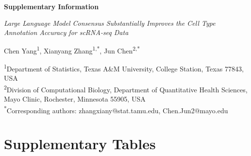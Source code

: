 \documentclass[11pt]{article}
\begin{document}
\begin{center}
\textcolor{natureteal}{\LARGE\textbf{Supplementary Information}}
\end{center}
\vspace{0.5cm}
\begin{center}
\textit{Large Language Model Consensus Substantially Improves the Cell Type Annotation Accuracy for scRNA-seq Data}
\end{center}
\vspace{0.3cm}
\begin{center}
Chen Yang\textsuperscript{1}, Xianyang Zhang\textsuperscript{1,*}, Jun Chen\textsuperscript{2,*}
\end{center}
\vspace{0.2cm}
\begin{center}
\small
\textsuperscript{1}Department of Statistics, Texas A\&M University, College Station, Texas 77843, USA\\
\textsuperscript{2}Division of Computational Biology, Department of Quantitative Health Sciences, Mayo Clinic, Rochester, Minnesota 55905, USA\\
\textsuperscript{*}Corresponding authors: zhangxiany@stat.tamu.edu, Chen.Jun2@mayo.edu
\end{center}
\vspace{1cm}

\section*{Supplementary Tables}
\end{document}
